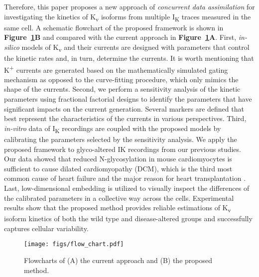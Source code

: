 \documentclass[11pt]{article}
\begin{document}
Therefore, this paper proposes a new approach of \textit{concurrent data assimilation} for investigating the kinetics of K\textsubscript{v} isoforms from multiple I\textsubscript{K} traces measured in the same cell. A schematic flowchart of the proposed framework is shown in \textbf{Figure~\ref{fig:flow_chart}B} and compared with the current approach in \textbf{Figure~\ref{fig:flow_chart}A}. First, \textit{in-silico} models of K\textsubscript{v} and their currents are designed with parameters that control the kinetic rates and, in turn, determine the currents. It is worth mentioning that K\textsuperscript{+} currents are generated based on the mathematically simulated gating mechanism as opposed to the curve-fitting procedure, which only mimics the shape of the currents. Second, we perform a sensitivity analysis of the kinetic parameters using fractional factorial designs to identify the parameters that have significant impacts on the current generation. Several markers are defined that best represent the characteristics of the currents in various perspectives. Third, \textit{in-vitro} data of I\textsubscript{K} recordings are coupled with the proposed models by calibrating the parameters selected by the sensitivity analysis. We apply the proposed framework to glyco-altered IK recordings from our previous studies. Our data showed that reduced N-glycosylation in mouse cardiomyocytes is sufficient to cause dilated cardiomyopathy (DCM), which is the third most common cause of heart failure and the major reason for heart transplantation \citep{weintraub2017dilated}. Last, low-dimensional embedding is utilized to visually inspect the differences of the calibrated parameters in a collective way across the cells. Experimental results show that the proposed method provides reliable estimations of K\textsubscript{v} isoform kinetics of both the wild type and disease-altered groups and successfully captures cellular variability.
\begin{figure}
    \centering
    \texttt{[image: figs/flow\_chart.pdf]}
    \caption{Flowcharts of (A) the current approach and (B) the proposed method.}
    \label{fig:flow_chart}
\end{figure}
\end{document}
